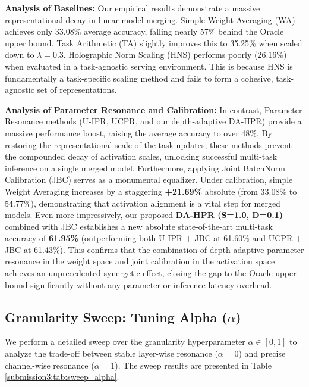 \documentclass{article}
\theoremstyle{plain}
\theoremstyle{definition}
\theoremstyle{remark}
\begin{document}
\textbf{Analysis of Baselines:}
Our empirical results demonstrate a massive representational decay in linear model merging.
Simple Weight Averaging (WA) achieves only 33.08\% average accuracy, falling nearly 57\% behind the Oracle upper bound.
Task Arithmetic (TA) slightly improves this to 35.25\% when scaled down to $\lambda = 0.3$.
Holographic Norm Scaling (HNS) performs poorly (26.16\%) when evaluated in a task-agnostic serving environment.
This is because HNS is fundamentally a task-specific scaling method and fails to form a cohesive, task-agnostic set of representations.

\textbf{Analysis of Parameter Resonance and Calibration:}
In contrast, Parameter Resonance methods (U-IPR, UCPR, and our depth-adaptive DA-HPR) provide a massive performance boost, raising the average accuracy to over 48\%.
By restoring the representational scale of the task updates, these methods prevent the compounded decay of activation scales, unlocking successful multi-task inference on a single merged model.
Furthermore, applying Joint BatchNorm Calibration (JBC) serves as a monumental equalizer.
Under calibration, simple Weight Averaging increases by a staggering \textbf{+21.69\%} absolute (from 33.08\% to 54.77\%), demonstrating that activation alignment is a vital step for merged models.
Even more impressively, our proposed \textbf{DA-HPR (S=1.0, D=0.1)} combined with JBC establishes a new absolute state-of-the-art multi-task accuracy of \textbf{61.95\%} (outperforming both U-IPR + JBC at 61.60\% and UCPR + JBC at 61.43\%).
This confirms that the combination of depth-adaptive parameter resonance in the weight space and joint calibration in the activation space achieves an unprecedented synergetic effect, closing the gap to the Oracle upper bound significantly without any parameter or inference latency overhead.

\subsection{Granularity Sweep: Tuning Alpha ($\alpha$)}
We perform a detailed sweep over the granularity hyperparameter $\alpha \in [0, 1]$ to analyze the trade-off between stable layer-wise resonance ($\alpha=0$) and precise channel-wise resonance ($\alpha=1$).
The sweep results are presented in Table \ref{submission3:tab:sweep_alpha}.
\end{document}
